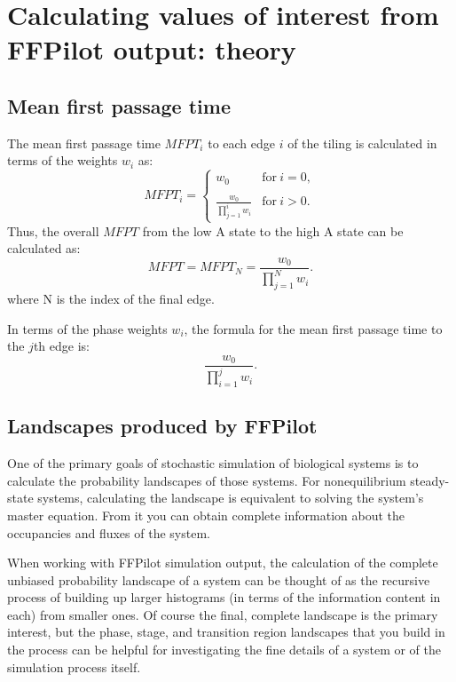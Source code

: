 \chapter{Calculating values of interest from FFPilot output: theory}
\section{Mean first passage time}
The mean first passage time $MFPT_i$ to each edge $i$ of the tiling is calculated in terms of the weights $w_i$ as:
\begin{equation}
    MFPT_i = 
        \begin{cases}
            w_0 & \text{for}\ i=0, \\
            \\
            \frac{w_0}{\prod_{j=1}^{i} w_i} & \text{for}\ i>0.
        \end{cases}
\end{equation}
Thus, the overall $MFPT$ from the low A state to the high A state can be calculated as:
\begin{equation}\label{eq:mfpt_from_weights}
    MFPT = MFPT_N = \frac{w_0}{\prod_{j=1}^{N} w_i}.
\end{equation}
where N is the index of the final edge.

In terms of the phase weights $w_i$, the formula for the mean first passage time to the $j$th edge is:
\begin{equation*}
    \frac{w_0}{\prod_{i=1}^{j} w_i}.
\end{equation*}

\section{Landscapes produced by FFPilot}\label{sec:landscape_theory}

One of the primary goals of stochastic simulation of biological systems is to calculate the probability landscapes of those systems. For nonequilibrium steady-state systems, calculating the landscape is equivalent to solving the system's master equation. From it you can obtain complete information about the occupancies and fluxes of the system.

When working with FFPilot simulation output, the calculation of the complete unbiased probability landscape of a system can be thought of as the recursive process of building up larger histograms (in terms of the information content in each) from smaller ones. Of course the final, complete landscape is the primary interest, but the phase, stage, and transition region landscapes that you build in the process can be helpful for investigating the fine details of a system or of the simulation process itself.

